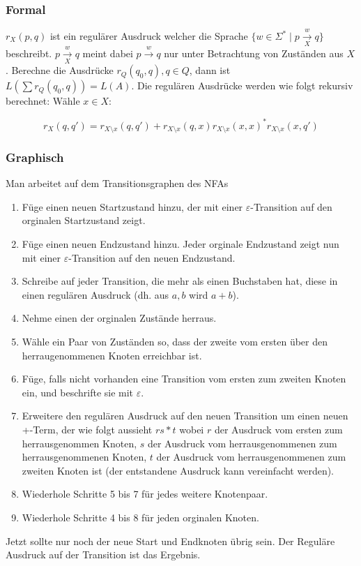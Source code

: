 \documentclass[11pt]{scrartcl}
\begin{document}
\subsubsection{Formal}

$r_X (p,q)$ ist ein regulärer Ausdruck welcher die Sprache $\{w \in \Sigma^*\mid p \overset{w}{\underset{X}{\rightarrow}} q\}$ beschreibt. $p \overset{w}{\underset{X}{\rightarrow}} q$ meint dabei $p \overset{w}{\rightarrow} q$ nur unter Betrachtung von Zuständen aus $X$. Berechne die Ausdrücke $r_Q (q_0,q), q \in Q$, dann ist $L(\sum r_Q(q_0, q)) = L(A)$. Die regulären Ausdrücke werden wie folgt rekursiv berechnet: Wähle $x \in X$:

\[r_X(q,q') = r_{X \setminus x}(q,q') + r_{X \setminus x}(q,x)r_{X \setminus x}(x,x)^*r_{X \setminus x}(x,q')\]
\subsubsection{Graphisch}

Man arbeitet auf dem Transitionsgraphen des NFAs

\begin{enumerate}
	\item Füge einen neuen Startzustand hinzu, der mit einer $\varepsilon$-Transition auf den orginalen Startzustand zeigt.
    \item Füge einen neuen Endzustand hinzu. Jeder orginale Endzustand zeigt nun mit einer $\varepsilon$-Transition auf den neuen Endzustand.
    \item Schreibe auf jeder Transition, die mehr als einen Buchstaben hat, diese in einen regulären Ausdruck (dh. aus $a,b$ wird $a + b$).
    \item Nehme einen der orginalen Zustände herraus.
    \item Wähle ein Paar von Zuständen so, dass der zweite vom ersten über den herraugenommenen Knoten erreichbar ist.
    \item Füge, falls nicht vorhanden eine Transition vom ersten zum zweiten Knoten ein, und beschrifte sie mit $\varepsilon$.
    \item Erweitere den regulären Ausdruck auf den neuen Transition um einen neuen +-Term, der wie folgt aussieht $rs*t$ wobei $r$ der Ausdruck vom ersten zum herrausgenommen Knoten, $s$ der Ausdruck vom herrausgenommenen zum herrausgenommenen Knoten, $t$ der Ausdruck vom herrausgenommenen zum zweiten Knoten ist (der entstandene Ausdruck kann vereinfacht werden).
    \item Wiederhole Schritte 5 bis 7 für jedes weitere Knotenpaar.
    \item Wiederhole Schritte 4 bis 8 für jeden orginalen Knoten.
\end{enumerate}
Jetzt sollte nur noch der neue Start und Endknoten übrig sein. Der Reguläre Ausdruck auf der Transition ist das Ergebnis.
\end{document}
